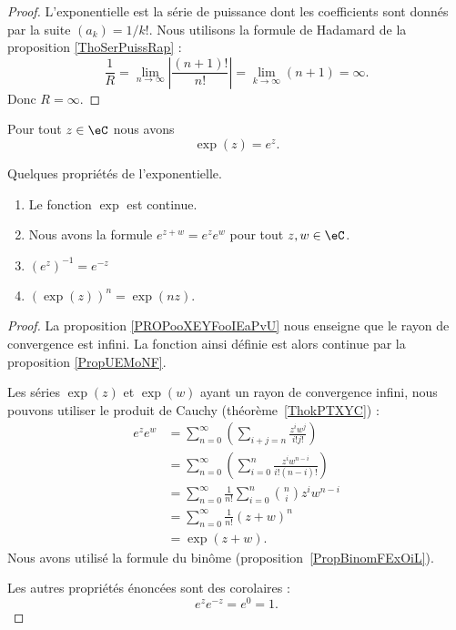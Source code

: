 \begin{proof}
    L'exponentielle est la série de puissance dont les coefficients sont donnés par la suite \( (a_k)=1/k!\). Nous utilisons la formule de Hadamard de la proposition \ref{ThoSerPuissRap} :
	\begin{equation}
		\frac{1}{ R }=\lim_{n\to \infty} \left| \frac{ (n+1)! }{ n! } \right| =\lim_{k\to \infty} (n+1)=\infty.
	\end{equation}
	Donc \( R=\infty\).
\end{proof}

\begin{proposition}     \label{PROPooWSDKooJREQGk}
	Pour tout \( z\in \eC\) nous avons
	\begin{equation}
		\exp(z)= e^{z}.
	\end{equation}
\end{proposition}

\begin{proposition}     \label{PropdDjisy}
	Quelques propriétés de l'exponentielle.
	\begin{enumerate}
		\item
		      Le fonction \( \exp\) est continue.
		\item       \label{ITEMooRLHCooJTuYKV}
		      Nous avons la formule \(  e^{z+w}= e^{z}e^w\) pour tout \( z,w\in \eC\).
		\item
		      \( (e^z)^{-1}= e^{-z}\)
		\item       \label{ITEMooIFYFooUniuKS}
		      \( (\exp(z))^n=\exp(nz)\).
	\end{enumerate}
\end{proposition}

\begin{proof}
	La proposition \ref{PROPooXEYFooIEaPvU} nous enseigne que le rayon de convergence est infini. La fonction ainsi définie est alors continue par la proposition \ref{PropUEMoNF}.

	Les séries \( \exp(z)\) et \( \exp(w)\) ayant un rayon de convergence infini, nous pouvons utiliser le produit de Cauchy (théorème~\ref{ThokPTXYC}) :
	\begin{subequations}
		\begin{align}
			e^{z} e^{w} & =\sum_{n=0}^{\infty}\left( \sum_{i+j=n}\frac{ z^iw^j }{ i!j! } \right)         \\
			            & =\sum_{n=0}^{\infty}\left( \sum_{i=0}^n\frac{ z^iw^{n-i} }{ i!(n-i)! } \right) \\
			            & =\sum_{n=0}^{\infty}\frac{1}{ n! }\sum_{i=0}^{n}{n\choose i}z^iw^{n-i}         \\
			            & =\sum_{n=0}^{\infty}\frac{1}{ n! }(z+w)^{n}                                    \\
			            & =\exp(z+w).
		\end{align}
	\end{subequations}
	Nous avons utilisé la formule du binôme (proposition~\ref{PropBinomFExOiL}).

	Les autres propriétés énoncées sont des corolaires :
	\begin{equation}
		e^{z} e^{-z}= e^{0}=1.
	\end{equation}
\end{proof}

